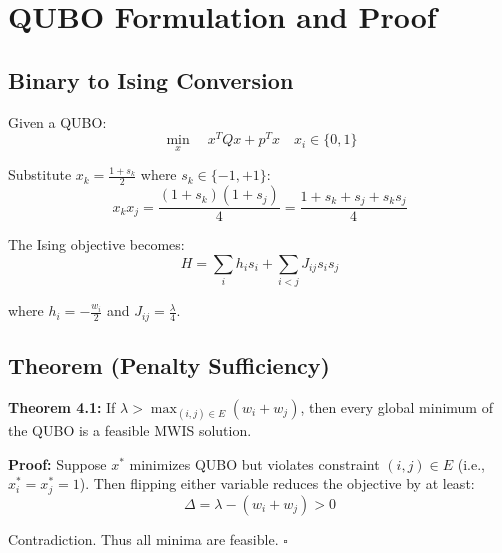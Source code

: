 \appendix
\chapter{QUBO Formulation and Proof}
\label{app:qubo}

\section{Binary to Ising Conversion}

Given a QUBO:
\[
\min_x \quad x^T Q x + p^T x \quad x_i \in \{0,1\}
\]

Substitute $x_k = \frac{1+s_k}{2}$ where $s_k \in \{-1,+1\}$:
\[
x_k x_j = \frac{(1+s_k)(1+s_j)}{4} = \frac{1 + s_k + s_j + s_k s_j}{4}
\]

The Ising objective becomes:
\[
H = \sum_i h_i s_i + \sum_{i<j} J_{ij} s_i s_j
\]

where $h_i = -\frac{w_i}{2}$ and $J_{ij} = \frac{\lambda}{4}$.

\section{Theorem (Penalty Sufficiency)}

\textbf{Theorem 4.1:} If $\lambda > \max_{(i,j) \in E} (w_i + w_j)$, then every global minimum of the QUBO is a feasible MWIS solution.

\textbf{Proof:} Suppose $x^*$ minimizes QUBO but violates constraint $(i,j) \in E$ (i.e., $x_i^* = x_j^* = 1$). Then flipping either variable reduces the objective by at least:
\[
\Delta = \lambda - (w_i + w_j) > 0
\]

Contradiction. Thus all minima are feasible. \hfill $\square$

